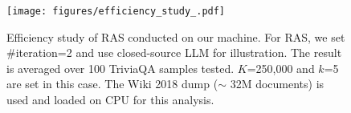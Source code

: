 \begin{figure}[tbp]
\centering
\texttt{[image: figures/efficiency\_study\_.pdf]}
\vspace{-2em}
\caption{Efficiency study of RAS conducted on our machine. For RAS, we set \#iteration=2 and use closed-source LLM for illustration. The result is averaged over 100 TriviaQA samples tested. $K$=250,000 and $k$=5 are set in this case. The Wiki 2018 dump ($\sim$ 32M documents) is used and loaded on CPU for this analysis. }
\label{fig:efficiency}
\end{figure}